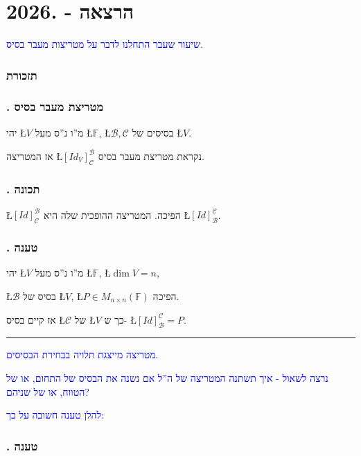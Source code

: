 \documentclass[english,hebrew]{article}
\newcommand{\sqrmn}{M_{n\times n}(\mathbb{F})}
\begin{document}
\part{הרצאה {\endL} - {.2026\endL}}

\textcolor{blue}{שיעור שעבר התחלנו לדבר על מטריצות מעבר בסיס.}

\section{תזכורת}

\section{{\endL}. מטריצת מעבר בסיס}

יהי \L{$V$} מ\textquotedblright ו נ\textquotedblright ס מעל \L{$\mathbb{F}$},
\L{$\mathcal{B},\mathcal{C}$} בסיסים של \L{$V$}.

אז המטריצה \L{$[Id_{V}]_{\mathcal{C}}^{\mathcal{B}}$} נקראת מטריצת
מעבר בסיס.

\section{{\endL}. תכונה}

\L{$[Id]_{\mathcal{C}}^{\mathcal{B}}$} הפיכה. המטריצה ההופכית שלה
היא \L{$[Id]_{\mathcal{B}}^{\mathcal{C}}$}.

\section{{\endL}. טענה}

יהי \L{$V$} מ\textquotedblright ו נ\textquotedblright ס מעל \L{$\mathbb{F}$},
\L{$\dim V=n$},

\L{$\mathcal{B}$} בסיס של \L{$V$}, \L{$P\in\sqrmn$} הפיכה.

אז קיים בסיס \L{$\mathcal{C}$} של \L{$V$} כך ש- \L{$[Id]_{\mathcal{B}}^{\mathcal{C}}=P$}.

\medskip{}

\rule[0.5ex]{1\columnwidth}{1pt}

\medskip{}
\textcolor{blue}{מטריצה מייצגת תלויה בבחירת הבסיסים.}

\textcolor{blue}{נרצה לשאול - איך תשתנה המטריצה של ה\textquotedblright ל
אם נשנה את הבסיס של התחום, או של הטווח, או של שניהם?}

\textcolor{blue}{להלן טענה חשובה על כך:}

\section{{\endL}. טענה}
\end{document}
